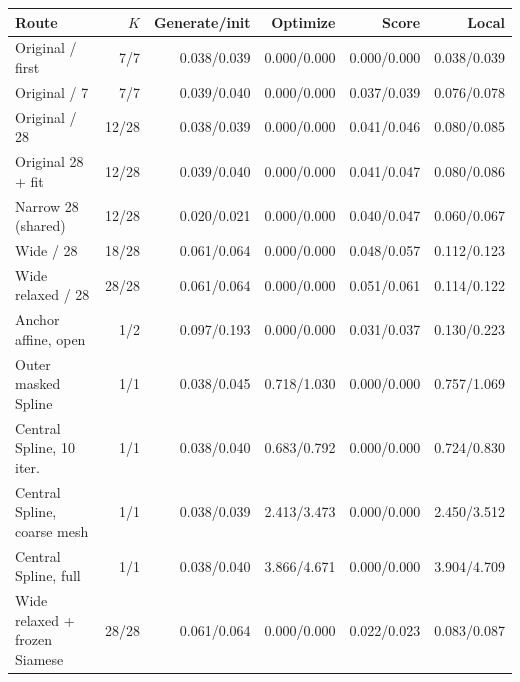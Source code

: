 \begin{tabular}{@{}lrrrrr@{}}
\toprule
Route & $K$ & Generate/init & Optimize & Score & Local \\
\midrule
Original / first & 7/7 & 0.038/0.039 & 0.000/0.000 & 0.000/0.000 & 0.038/0.039 \\
Original / 7 & 7/7 & 0.039/0.040 & 0.000/0.000 & 0.037/0.039 & 0.076/0.078 \\
Original / 28 & 12/28 & 0.038/0.039 & 0.000/0.000 & 0.041/0.046 & 0.080/0.085 \\
Original 28 + fit & 12/28 & 0.039/0.040 & 0.000/0.000 & 0.041/0.047 & 0.080/0.086 \\
Narrow 28 (shared) & 12/28 & 0.020/0.021 & 0.000/0.000 & 0.040/0.047 & 0.060/0.067 \\
Wide / 28 & 18/28 & 0.061/0.064 & 0.000/0.000 & 0.048/0.057 & 0.112/0.123 \\
Wide relaxed / 28 & 28/28 & 0.061/0.064 & 0.000/0.000 & 0.051/0.061 & 0.114/0.122 \\
Anchor affine, open & 1/2 & 0.097/0.193 & 0.000/0.000 & 0.031/0.037 & 0.130/0.223 \\
Outer masked Spline & 1/1 & 0.038/0.045 & 0.718/1.030 & 0.000/0.000 & 0.757/1.069 \\
Central Spline, 10 iter. & 1/1 & 0.038/0.040 & 0.683/0.792 & 0.000/0.000 & 0.724/0.830 \\
Central Spline, coarse mesh & 1/1 & 0.038/0.039 & 2.413/3.473 & 0.000/0.000 & 2.450/3.512 \\
Central Spline, full & 1/1 & 0.038/0.040 & 3.866/4.671 & 0.000/0.000 & 3.904/4.709 \\
Wide relaxed + frozen Siamese & 28/28 & 0.061/0.064 & 0.000/0.000 & 0.022/0.023 & 0.083/0.087 \\
\bottomrule
\end{tabular}
